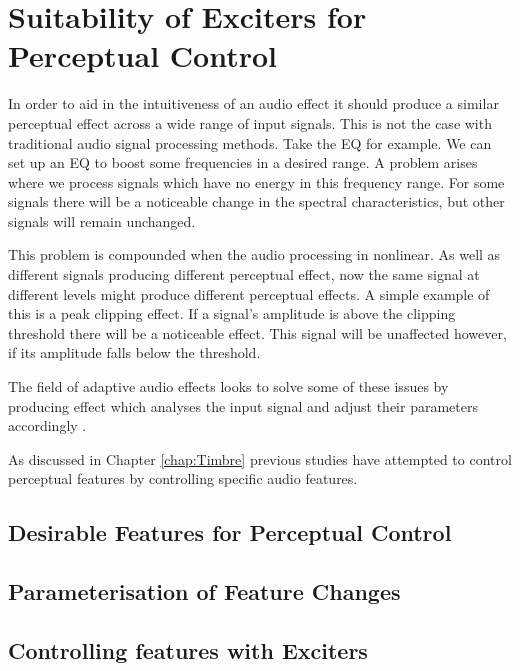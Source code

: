 
\chapter{Suitability of Exciters for Perceptual Control}
\label{chap:FeatureControl}

	In order to aid in the intuitiveness of an audio effect it should produce a similar perceptual effect across a wide range of input signals. This is not the case with traditional audio signal processing methods. Take the EQ for example. We can set up an EQ to boost some frequencies in a desired range. A problem arises where we process signals which have no energy in this frequency range. For some signals there will be a noticeable change in the spectral characteristics, but other signals will remain unchanged.

	This problem is compounded when the audio processing in nonlinear. As well as different signals producing different perceptual effect, now the same signal at different levels might produce different perceptual effects. A simple example of this is a peak clipping effect. If a signal's amplitude is above the clipping threshold there will be a noticeable effect. This signal will be unaffected however, if its amplitude falls below the threshold.

	The field of adaptive audio effects looks to solve some of these issues by producing effect which analyses the input signal and adjust their parameters accordingly .

	As discussed in Chapter \ref{chap:Timbre} previous studies have attempted to control perceptual features by controlling specific audio features.

\section{Desirable Features for Perceptual Control}
\label{sec:FeatureControl-MethodFeatures}

\section{Parameterisation of Feature Changes}
\label{sec:FeatureControl-Parameterisation}

\section{Controlling features with Exciters}
\label{sec:FeatureControl-Control}
